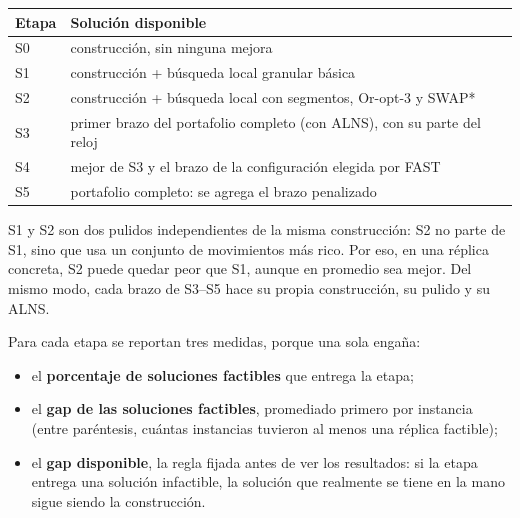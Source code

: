 \documentclass[11pt,a4paper]{article}
\begin{document}
\begin{center}
\small
\begin{tabular}{@{}ll@{}}
\toprule
Etapa & Solución disponible \\
\midrule
S0 & construcción, sin ninguna mejora \\
S1 & construcción + búsqueda local granular básica \\
S2 & construcción + búsqueda local con segmentos, Or-opt-3 y SWAP* \\
S3 & primer brazo del portafolio completo (con ALNS), con su parte del reloj \\
S4 & mejor de S3 y el brazo de la configuración elegida por FAST \\
S5 & portafolio completo: se agrega el brazo penalizado \\
\bottomrule
\end{tabular}
\end{center}

\noindent S1 y S2 son dos pulidos independientes de la misma construcción: S2 no parte de S1, sino
que usa un conjunto de movimientos más rico. Por eso, en una réplica concreta, S2 puede quedar peor
que S1, aunque en promedio sea mejor. Del mismo modo, cada brazo de S3--S5 hace su propia
construcción, su pulido y su ALNS.

Para cada etapa se reportan tres medidas, porque una sola engaña:
\begin{itemize}[leftmargin=1.5em]
\item el \textbf{porcentaje de soluciones factibles} que entrega la etapa;
\item el \textbf{gap de las soluciones factibles}, promediado primero por instancia (entre
paréntesis, cuántas instancias tuvieron al menos una réplica factible);
\item el \textbf{gap disponible}, la regla fijada antes de ver los resultados: si la etapa entrega una
solución infactible, la solución que realmente se tiene en la mano sigue siendo la construcción.
\end{itemize}
\end{document}
